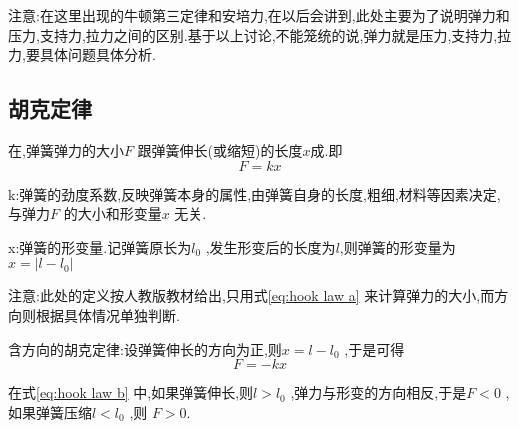  注意:在这里出现的牛顿第三定律和安培力,在以后会讲到,此处主要为了说明弹力和压力,支持力,拉力之间的区别.基于以上讨论,不能笼统的说,弹力就是压力,支持力,拉力,要具体问题具体分析.
 
 \subsection{胡克定律}
 在,弹簧弹力的大小$F$ 跟弹簧伸长(或缩短)的长度$x$成.即
 \begin{equation}
   F=kx
   \label{eq:hook law a}
 \end{equation}

k:弹簧的劲度系数,反映弹簧本身的属性,由弹簧自身的长度,粗细,材料等因素决定,与弹力$F$ 的大小和形变量$x$ 无关.

x:弹簧的形变量.记弹簧原长为$l_0$ ,发生形变后的长度为$l$,则弹簧的形变量为$x=|l-l_0|$

注意:此处的定义按人教版教材给出,只用式\eqref{eq:hook law a} 来计算弹力的大小,而方向则根据具体情况单独判断.

含方向的胡克定律:设弹簧伸长的方向为正,则$x=l-l_0$ ,于是可得
\begin{equation}
  F=-kx
  \label{eq:hook law b}
\end{equation}

在式\eqref{eq:hook law b} 中,如果弹簧伸长,则$l>l_0$ ,弹力与形变的方向相反,于是$F<0$ ,如果弹簧压缩$l<l_0$ ,则 $F>0$.

